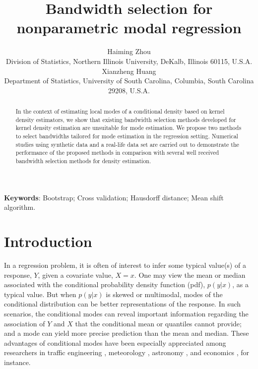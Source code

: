 \documentclass[fleqn,12pt,twoside]{article}
\numberwithin{equation}{section}
\begin{document}
\title{Bandwidth selection for nonparametric modal regression}
\date{}
\author{\small{Haiming Zhou}\\
\small{Division of Statistics, Northern Illinois University, DeKalb, Illinois 60115, U.S.A.}\\
\small{Xianzheng Huang}\\
\small{Department of Statistics, University of South Carolina, Columbia, South Carolina 29208, U.S.A.}}
\maketitle


\begin{abstract}
In the context of estimating local modes of a conditional density based on kernel density estimators, we show that existing bandwidth selection methods developed for kernel density estimation are unsuitable for mode estimation. We propose two methods to select bandwidths tailored for mode estimation in the regression setting. Numerical studies using synthetic data and a real-life data set are carried out to demonstrate the performance of the proposed methods in comparison with several well received bandwidth selection methods for density estimation. 
\end{abstract}

\noindent
{\bf Keywords}: Bootstrap; Cross validation; Hausdorff distance; Mean shift algorithm.

\section{Introduction}
\label{s:intro}
In a regression problem, it is often of interest to infer some typical value(s) of a response, $Y$, given a covariate value, $X=x$. One may view the mean or median associated with the conditional probability density function (pdf), $p(y|x)$, as a typical value. But when $p(y|x)$ is skewed or multimodal, modes of the conditional distribution can be better representations of the response. In such scenarios, the conditional modes can reveal important information regarding the association of $Y$ and $X$ that the conditional mean or quantiles cannot provide; and a mode can yield more precise prediction than the mean and median. These advantages of conditional modes have been especially appreciated among researchers in traffic engineering \citep{Einbeck.Tutz2006}, meteorology \citep{Hyndman.etal1996}, astronomy \citep{bamford2008revealing}, and economics \citep{Huang.Yao2012}, for instance. 
\end{document}
